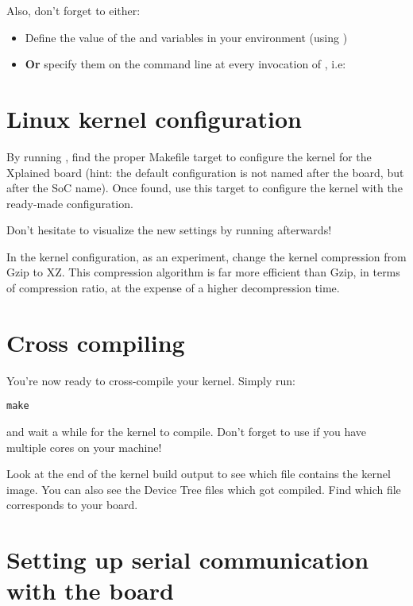 Also, don't forget to either:

\begin{itemize}
\item Define the value of the  and 
  variables in your environment (using )
\item {\bf Or} specify them on the command line at every invocation of
  , i.e: 
\end{itemize}

\section{Linux kernel configuration}

By running , find the proper Makefile target to
configure the kernel for the Xplained board (hint: the default
configuration is not named after the board, but after the SoC
name). Once found, use this target to configure the kernel with the
ready-made configuration.

Don't hesitate to visualize the new settings by running
 afterwards!

In the kernel configuration, as an experiment, change the kernel
compression from Gzip to XZ. This compression algorithm is far more
efficient than Gzip, in terms of compression ratio, at the expense of
a higher decompression time.

\section{Cross compiling}

You're now ready to cross-compile your kernel. Simply run:

\begin{verbatim}
make
\end{verbatim}

and wait a while for the kernel to compile. Don't forget to use
 if you have multiple cores on your machine!

Look at the end of the kernel build output to see which file contains
the kernel image. You can also see the Device Tree  files
which got compiled. Find which  file corresponds to your
board.

\section{Setting up serial communication with the board}

